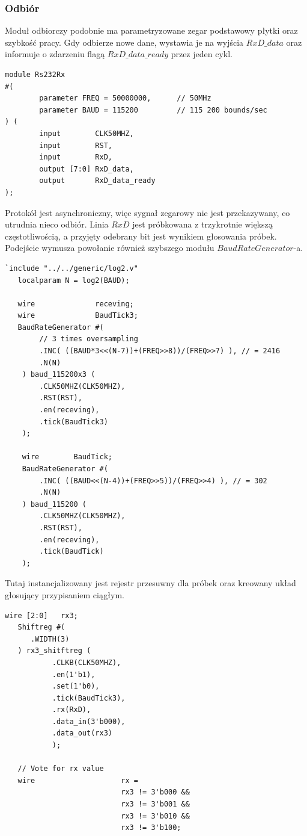 \documentclass[a4paper,12pt]{article}
\begin{document}
\subsubsection{Odbiór}
Moduł odbiorczy podobnie ma parametryzowane zegar podstawowy płytki oraz szybkość pracy. Gdy odbierze nowe dane, wystawia je na wyjścia $RxD\_data$ oraz informuje o zdarzeniu flagą $RxD\_data\_ready$ przez jeden cykl.
\begin{lstlisting}[label=Rs232Rx,caption=Rs232Rx.v]
module Rs232Rx
#(
        parameter FREQ = 50000000,      // 50MHz
        parameter BAUD = 115200         // 115 200 bounds/sec
) (
        input        CLK50MHZ,
        input        RST,
        input        RxD,
        output [7:0] RxD_data,
        output       RxD_data_ready
);
\end{lstlisting}

Protokół jest asynchroniczny, więc sygnał zegarowy nie jest przekazywany, co utrudnia nieco odbiór. Linia $RxD$ jest próbkowana z trzykrotnie większą częstotliwością, a przyjęty odebrany bit jest wynikiem głosowania próbek. Podejście wymusza powołanie również szybszego modułu $BaudRateGenerator$-a.
\begin{lstlisting}[label=Rs232Rx,caption=Rs232Rx.v,firstnumber=13]
   `include "../../generic/log2.v"
   localparam N = log2(BAUD);

   wire              receving;
   wire              BaudTick3;
   BaudRateGenerator #(
        // 3 times oversampling
        .INC( ((BAUD*3<<(N-7))+(FREQ>>8))/(FREQ>>7) ), // = 2416
        .N(N)
    ) baud_115200x3 (
        .CLK50MHZ(CLK50MHZ),
        .RST(RST),
        .en(receving),
        .tick(BaudTick3)
    );

    wire        BaudTick;
    BaudRateGenerator #(
        .INC( ((BAUD<<(N-4))+(FREQ>>5))/(FREQ>>4) ), // = 302
        .N(N)
    ) baud_115200 (
        .CLK50MHZ(CLK50MHZ),
        .RST(RST),
        .en(receving),
        .tick(BaudTick)
    );
\end{lstlisting}

Tutaj instancjalizowany jest rejestr przesuwny dla próbek oraz kreowany układ głosujący przypisaniem ciągłym.
\begin{lstlisting}[label=Rs232Rx,caption=Rs232Rx.v,firstnumber=40]
   wire [2:0]   rx3;
   Shiftreg #(
      .WIDTH(3)
   ) rx3_shitftreg (
           .CLKB(CLK50MHZ),
           .en(1'b1),
           .set(1'b0),
           .tick(BaudTick3),
           .rx(RxD),
           .data_in(3'b000),
           .data_out(rx3)
           );

   // Vote for rx value
   wire                    rx =
                           rx3 != 3'b000 &&
                           rx3 != 3'b001 &&
                           rx3 != 3'b010 &&
                           rx3 != 3'b100;
\end{lstlisting}
\end{document}
